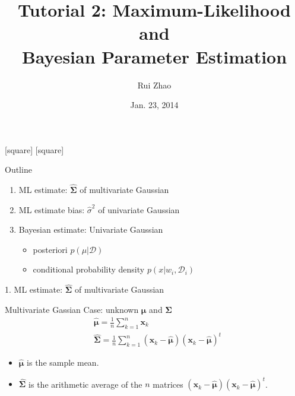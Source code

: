 \documentclass[compress,blue]{beamer}
\title[ENGG 5202 Pattern Recogntion Tutorial 2]{Tutorial 2: Maximum-Likelihood and \\ Bayesian Parameter Estimation}
\author{Rui Zhao}
\institute{rzhao@ee.cuhk.edu.hk}
\date{Jan. 23, 2014}
\newcommand{\bx}{\mathbf{x}}
\newcommand{\bmu}{\mathbf{\mu}}
\newcommand{\bSig}{\mathbf{\Sigma}}
\newcommand{\calD}{\mathcal{D}}
\begin{document}
\begin{frame}
\titlepage
\end{frame}

[square]
[square]

\begin{frame}{Outline}
	\begin{enumerate}
		\item<1-> ML estimate: $\hat{\bSig}$ of multivariate Gaussian 
		\vspace{0.1in}
		\item<2-> ML estimate bias: $\hat{\sigma}^2$ of univariate Gaussian
		\vspace{0.1in}
		\item<3-> Bayesian estimate: Univariate Gaussian
		\begin{itemize}
			\item posteriori $p(\mu|\calD)$
			\item conditional probability density $p(x | w_i, \calD_i)$
		\end{itemize}
	\end{enumerate}
\end{frame}

\begin{frame}{1. ML estimate: $\hat{\bSig}$ of multivariate Gaussian }
	\begin{block}{Multivariate Gassian Case: unknown $\bmu$ and $\bSig$}
		\begin{align}
			&\hat{\bmu} = \frac{1}{n}\sum_{k=1}^n\bx_k\\
			&\hat{\bSig} = \frac{1}{n}\sum_{k=1}^n(\bx_k - \hat{\bmu})(\bx_k - \hat{\bmu})^t
		\end{align}
		\small
		\begin{itemize}
			\item $\hat{\bmu}$ is the sample mean. 
			\item $\hat{\bSig}$ is the arithmetic average of the $n$ matrices $(\bx_k - \hat{\bmu})(\bx_k - \hat{\bmu})^t$.
		\end{itemize}
		\normalsize
	\end{block}	
\end{frame}
\end{document}
